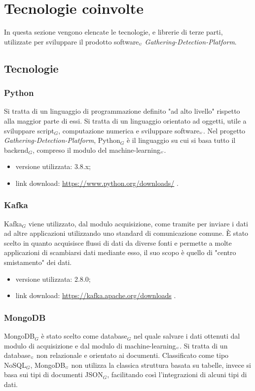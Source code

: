\chapter{Tecnologie coinvolte}\label{TecnologieCoinvolte}
In questa sezione vengono elencate le tecnologie, e librerie di terze parti, utilizzate per sviluppare il prodotto software$_{\scaleto{G}{3pt}}$ \textit{Gathering-Detection-Platform}.

\section{Tecnologie}\label{Tecnologie}
\subsection{Python}\label{TecnologiePython}
Si tratta di un linguaggio di programmazione definito "ad alto livello" rispetto alla maggior parte di essi.
Si tratta di un linguaggio orientato ad oggetti, utile a sviluppare script$_G$, computazione numerica e sviluppare software$_{\scaleto{G}{3pt}}$.
Nel progetto \textit{Gathering-Detection-Platform}, Python$_G$ è il linguaggio su cui si basa tutto il backend$_G$, compreso il modulo del machine-learning$_{\scaleto{G}{3pt}}$.

\begin{itemize}
  \item versione utilizzata: 3.8.x;
  \item link download: \url{https://www.python.org/downloads/} .
\end{itemize}

\subsection{Kafka}\label{TecnologieKafka}
Kafka$_G$ viene utilizzato, dal modulo acquisizione, come tramite per inviare i dati ad altre applicazioni utilizzando uno standard di comunicazione comune.
È stato scelto in quanto acquisisce flussi di dati da diverse fonti e permette a molte applicazioni di scambiarsi dati mediante esso, il suo scopo è quello di "centro smistamento" dei dati.

\begin{itemize}
  \item versione utilizzata: 2.8.0;
  \item link download: \url{https://kafka.apache.org/downloads} .
\end{itemize}

\subsection{MongoDB}\label{TecnologieMongoDB}
MongoDB$_G$ è stato scelto come database$_G$ nel quale salvare i dati ottenuti dal modulo di acquisizione e dal modulo di machine-learning$_{\scaleto{G}{3pt}}$.
Si tratta di un database$_{\scaleto{G}{3pt}}$ non relazionale e orientato ai documenti.
Classificato come tipo NoSQL$_G$, MongoDB$_{\scaleto{G}{3pt}}$ non utilizza la classica struttura basata su tabelle, invece si basa sui tipi di documenti JSON$_G$, facilitando così l'integrazioni di alcuni tipi di dati.

